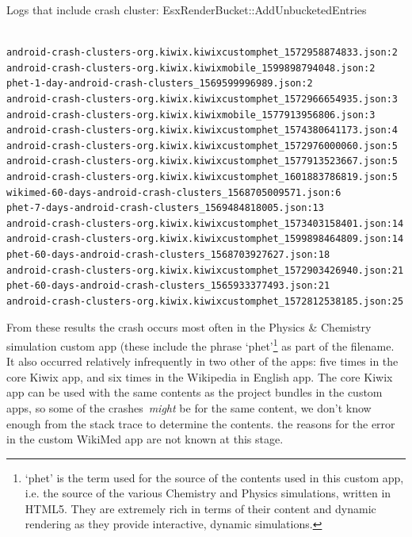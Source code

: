 \begin{listing}[H]
\caption{Logs that include crash cluster: EsxRenderBucket::AddUnbucketedEntries} \label{code:vitals_scraper_logs_add_unbucketed_entries}
\footnotesize
\begin{verbatim}

android-crash-clusters-org.kiwix.kiwixcustomphet_1572958874833.json:2
android-crash-clusters-org.kiwix.kiwixmobile_1599898794048.json:2
phet-1-day-android-crash-clusters_1569599996989.json:2
android-crash-clusters-org.kiwix.kiwixcustomphet_1572966654935.json:3
android-crash-clusters-org.kiwix.kiwixmobile_1577913956806.json:3
android-crash-clusters-org.kiwix.kiwixcustomphet_1574380641173.json:4
android-crash-clusters-org.kiwix.kiwixcustomphet_1572976000060.json:5
android-crash-clusters-org.kiwix.kiwixcustomphet_1577913523667.json:5
android-crash-clusters-org.kiwix.kiwixcustomphet_1601883786819.json:5
wikimed-60-days-android-crash-clusters_1568705009571.json:6
phet-7-days-android-crash-clusters_1569484818005.json:13
android-crash-clusters-org.kiwix.kiwixcustomphet_1573403158401.json:14
android-crash-clusters-org.kiwix.kiwixcustomphet_1599898464809.json:14
phet-60-days-android-crash-clusters_1568703927627.json:18
android-crash-clusters-org.kiwix.kiwixcustomphet_1572903426940.json:21
phet-60-days-android-crash-clusters_1565933377493.json:21
android-crash-clusters-org.kiwix.kiwixcustomphet_1572812538185.json:25
\end{verbatim}

\end{listing}

From these results the crash occurs most often in the Physics \& Chemistry simulation custom app (these include the phrase `phet'\footnote{`phet' is the term used for the source of the contents used in this custom app, i.e. the source of the various Chemistry and Physics simulations, written in HTML5. They are extremely rich in terms of their content and dynamic rendering as they provide interactive, dynamic simulations.} as part of the filename. It also occurred relatively infrequently in two other of the apps: five times in the core Kiwix app, and six times in the Wikipedia in English app. The core Kiwix app can be used with the same contents as the project bundles in the custom apps, so some of the crashes~\emph{might} be for the same content, we don't know enough from the stack trace to determine the contents. the reasons for the error in the custom WikiMed app are not known at this stage. 

